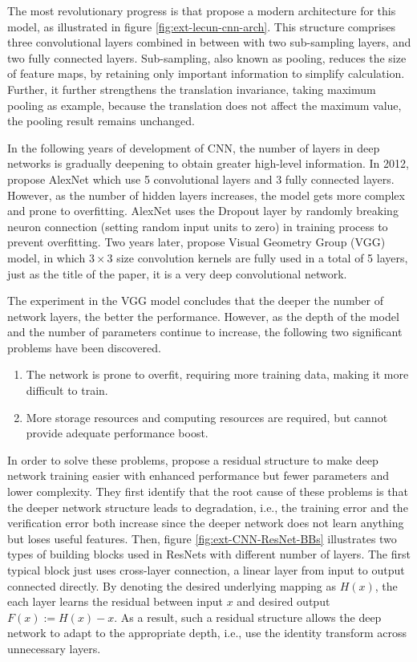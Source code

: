 The most revolutionary progress is that \citet{lecun2010convolutional} propose a modern architecture for this model, as illustrated in figure \ref{fig:ext-lecun-cnn-arch}.
This structure comprises three convolutional layers combined in between with two sub-sampling layers, and two fully connected layers. Sub-sampling, also known as pooling, reduces the size of feature maps, by retaining only important information to simplify calculation.
Further, it further strengthens the translation invariance, taking maximum pooling as example, because the translation does not affect the maximum value, the pooling result remains unchanged.

In the following years of development of CNN, the number of layers in deep networks is gradually deepening to obtain greater high-level information.
In 2012, \citet{krizhevsky2012imagenet} propose AlexNet which use 5 convolutional layers and 3 fully connected layers.
However, as the number of hidden layers increases, the model gets more complex and prone to overfitting.
AlexNet uses the Dropout layer by randomly breaking neuron connection (setting random input units to zero) in training process to prevent overfitting. 
Two years later, \citet{simonyan2014very} propose Visual Geometry Group (VGG) model, in which $3\times3$ size convolution kernels are fully used in a total of 5 layers, just as the title of the paper, it is a very deep convolutional network.

The experiment in the VGG model concludes that the deeper the number of network layers, the better the performance.
However, as the depth of the model and the number of parameters continue to increase, the following two significant problems have been discovered.

\begin{enumerate}
    \item The network is prone to overfit, requiring more training data, making it more difficult to train.
    \item More storage resources and computing resources are required, but cannot provide adequate performance boost. 
\end{enumerate}

In order to solve these problems, \citet{he2015deep} propose a residual structure to make deep network training easier with enhanced performance but fewer parameters and lower complexity. 
They first identify that the root cause of these problems is that the deeper network structure leads to degradation, i.e., the training error and the verification error both increase since the deeper network does not learn anything but loses useful features.
Then, figure \ref{fig:ext-CNN-ResNet-BBs} illustrates two types of building blocks used in ResNets with different number of layers.
The first typical block just uses cross-layer connection, a linear layer from input to output connected directly.
By denoting the desired underlying mapping as $H(x)$, the each layer learns the residual between input $x$ and desired output $F(x):=H(x)-x$.
As a result, such a residual structure allows the deep network to adapt to the appropriate depth, i.e., use the identity transform across unnecessary layers.

